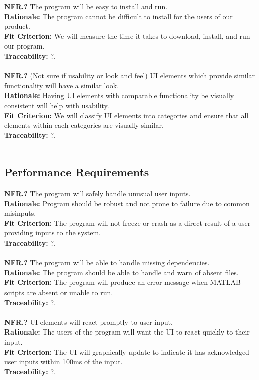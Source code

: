 \documentclass[12pt]{article}
\begin{document}
  \textbf{NFR.?} The program will be easy to install and run.\\
  \textbf{Rationale:} The program cannot be difficult to install for the users of our product.\\
  \textbf{Fit Criterion:} We will measure the time it takes to download, install, and run our program.\\
  \textbf{Traceability:} ?.\\\\

  \textbf{NFR.?} (Not sure if usability or look and feel) UI elements which provide similar functionality will have a similar look.\\
  \textbf{Rationale:} Having UI elements with comparable functionality be visually consistent will help with usability.\\
  \textbf{Fit Criterion:} We will classify UI elements into categories and ensure that all elements within each categories are visually similar.\\
  \textbf{Traceability:} ?.\\\\

\subsection{Performance Requirements}

  \textbf{NFR.?} The program will safely handle unusual user inputs.\\
  \textbf{Rationale:} Program should be robust and not prone to failure due to common misinputs.\\
  \textbf{Fit Criterion:} The program will not freeze or crash as a direct result of a user providing inputs to the system.\\
  \textbf{Traceability:} ?.\\\\

  \textbf{NFR.?} The program will be able to handle missing dependencies.\\
  \textbf{Rationale:} The program should be able to handle and warn of absent files.\\
  \textbf{Fit Criterion:} The program will produce an error message when MATLAB scripts are absent or unable to run.\\
  \textbf{Traceability:} ?.\\\\

  \textbf{NFR.?} UI elements will react promptly to user input.\\
  \textbf{Rationale:} The users of the program will want the UI to react quickly to their input.\\
  \textbf{Fit Criterion:} The UI will graphically update to indicate it has acknowledged user inputs within 100ms of the input.\\
  \textbf{Traceability:} ?.\\\\
\end{document}

